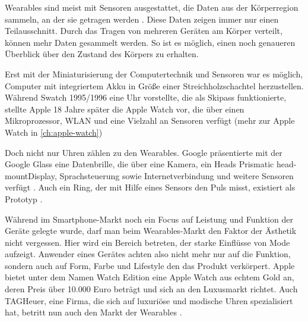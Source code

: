 Wearables sind meist mit Sensoren ausgestattet, die Daten aus der Körperregion sammeln, an der sie getragen werden \cite{4711366}. Diese Daten zeigen immer nur einen Teilausschnitt. Durch das Tragen von mehreren Geräten am Körper verteilt, können mehr Daten gesammelt werden. So ist es möglich, einen noch genaueren Überblick über den Zustand des Körpers zu erhalten\cite{4711366}.

Erst mit der Miniaturisierung der Computertechnik und Sensoren war es möglich, Computer mit integriertem Akku in Größe einer Streichholzschachtel herzustellen. Während Swatch 1995/1996 eine Uhr vorstellte, die als Skipass funktionierte, stellte Apple 18 Jahre später die Apple Watch vor, die über einen Mikroprozessor, WLAN und eine Vielzahl an Sensoren verfügt (mehr zur Apple Watch in \ref{ch:apple-watch})

Doch nicht nur Uhren zählen zu den Wearables. Google präsentierte mit der Google Glass eine Datenbrille, die über eine Kamera, ein Heads \glqq Prismatic head-mount\glqq  Display, Sprachsteuerung sowie Internetverbindung und weitere Sensoren verfügt \cite{Muensterer2014281}. Auch ein Ring, der mit Hilfe eines Sensors den Puls misst, existiert als Prototyp \cite{4711366}.

Während im Smartphone-Markt noch ein Focus auf Leistung und Funktion der Geräte gelegte wurde, darf man beim Wearables-Markt den Faktor der Ästhetik nicht vergessen. Hier wird ein Bereich betreten, der starke Einflüsse von Mode aufzeigt. Anwender eines Gerätes achten also nicht mehr nur auf die Funktion, sondern auch auf Form, Farbe und Lifestyle den das Produkt verkörpert. Apple bietet unter dem Namen \glqq Watch Edition \grqq eine Apple Watch aus echtem Gold an, deren Preis über 10.000 Euro beträgt und sich an den Luxusmarkt richtet. Auch TAGHeuer, eine Firma, die sich auf luxuriöse und modische Uhren spezialisiert hat, betritt nun auch den Markt der Wearables \cite{TAGHeuer:20015aa}.